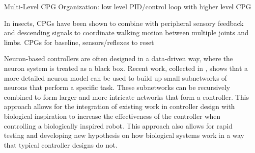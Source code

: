 Multi-Level CPG Organization: low level PID/control loop with higher level CPG
\cite{MultiLevelCPG}

In insects, CPGs have been shown to combine with peripheral sensory feedback and
descending signals to coordinate walking motion between multiple joints and
limbs.
CPGs for baseline, sensors/reflexes to reset \cite{SixLeggedWalking}


Neuron-based controllers are often designed in a data-driven way, where the
neuron system is treated as a black box. Recent work, collected in 
\cite{NickFunctionalSubnetwork}, shows that a more detailed neuron model can be
used to build up small subnetworks of neurons that perform a specific task.
These subnetworks can be recursively combined to form larger and more intricate
networks that form a controller. This approach allows for the integration of
existing work in controller design with biological inspiration to increase the
effectiveness of the controller when controlling a biologically inspired robot.
This approach also allows for rapid testing and developing new hypothesis on how
biological systems work in a way that typical controller designs do not.
